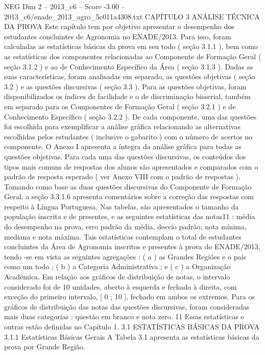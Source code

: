 \begin{textsample}{NEG Dim 2 – 2013\_c6 – Score -3.00 – 2013\_c6/enade\_2013\_agro\_5c011a4308.txt}  \label{ex:f2_neg_055}
CAPÍTULO 3 ANÁLISE TÉCNICA DA PROVA Este capítulo tem por objetivo apresentar o desempenho dos estudantes concluintes de Agronomia no ENADE/2013.
Para isso, foram calculadas as estatísticas básicas da prova em seu todo ( seção 3.1.1 ), bem como as estatísticas dos componentes relacionadas ao Componente de Formação Geral ( seção 3.1.2 ) e ao de Conhecimento Específico da Área ( seção 3.1.3 ).
Dadas as suas características, foram analisadas em separado, as questões objetivas ( seção 3.2 ) e as questões discursivas ( seção 3.3 ).
Para as questões objetivas, foram disponibilizados os índices de facilidade e o de discriminação bisserial, também em separado para os Componentes de Formação Geral ( seção 3.2.1 ) e de Conhecimento Específico ( seção 3.2.2 ).
De cada componente, uma das questões foi escolhida para exemplificar a análise gráfica relacionando as alternativas escolhidas pelos estudantes ( inclusive o gabarito ) com o número de acertos no componente.
O Anexo I apresenta a íntegra da análise gráfica para todas as questões objetivas.
Para cada uma das questões discursivas, os conteúdos dos tipos mais comuns de respostas dos alunos são apresentados e comparados com o padrão de resposta esperado ( ver Anexo VIII com o padrão de respostas ).
Tomando como base as duas questões discursivas do Componente de Formação Geral, a seção 3.3.1.6 apresenta comentários sobre a correção das respostas com respeito à Língua Portuguesa.
Nas tabelas, são apresentados o tamanho da população inscrita e de presentes, e as seguintes estatísticas das notas11 : média do desempenho na prova, erro padrão da média, desvio padrão, nota mínima, mediana e nota máxima.
Tais estatísticas contemplam o total de estudantes concluintes da Área de Agronomia inscritos e presentes à prova do ENADE/2013, tendo -se em vista as seguintes agregações : ( a ) as Grandes Regiões e o país como um todo ; ( b ) a Categoria Administrativa ; e ( c ) a Organização Acadêmica.
Em relação aos gráficos de distribuição de notas, o intervalo considerado foi de 10 unidades, aberto à esquerda e fechado à direita, com exceção do primeiro intervalo, [ 0 ; 10 ], fechado em ambos os extremos.
Para os gráficos de distribuição das notas das questões discursivas, foram consideradas mais duas categorias : questão em branco e nota zero. 11 Essas estatísticas e outras estão definidas no Capítulo 1. 3.1 ESTATÍSTICAS BÁSICAS DA PROVA 3.1.1 Estatísticas Básicas Gerais A Tabela 3.1 apresenta as estatísticas básicas da prova por Grande Região.

\end{textsample}
